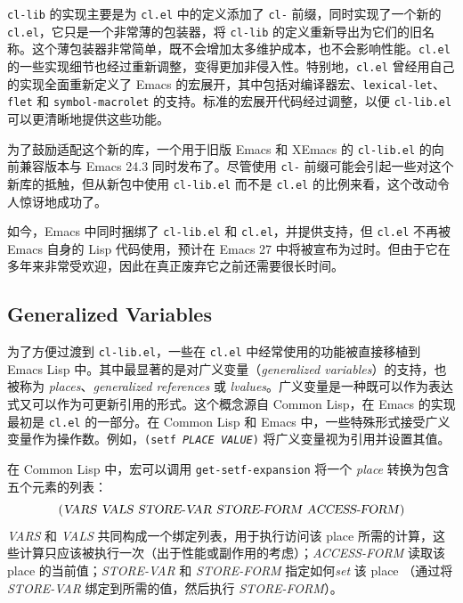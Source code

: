 \documentclass[format=acmsmall,screen]{acmart}
\newcommand \id[1] {\textrm{\textsl{#1}}}
\begin{document}
\texttt{cl-lib} 的实现主要是为 \texttt{cl.el} 中的定义添加了 \texttt{cl-} 前缀，同时实现了一个新的 \texttt{cl.el}，它只是一个非常薄的包装器，将 \texttt{cl-lib} 的定义重新导出为它们的旧名称。这个薄包装器非常简单，既不会增加太多维护成本，也不会影响性能。\texttt{cl.el} 的一些实现细节也经过重新调整，变得更加非侵入性。特别地，\texttt{cl.el} 曾经用自己的实现全面重新定义了 Emacs 的宏展开，其中包括对编译器宏、\texttt{lexical-let}、\texttt{flet} 和 \texttt{symbol-macrolet} 的支持。标准的宏展开代码经过调整，以便 \texttt{cl-lib.el} 可以更清晰地提供这些功能。

为了鼓励适配这个新的库，一个用于旧版 Emacs 和 XEmacs 的 \texttt{cl-lib.el} 的向前兼容版本与 Emacs 24.3 同时发布了。尽管使用 \texttt{cl-} 前缀可能会引起一些对这个新库的抵触，但从新包中使用 \texttt{cl-lib.el} 而不是 \texttt{cl.el} 的比例来看，这个改动令人惊讶地成功了。

如今，Emacs 中同时捆绑了 \texttt{cl-lib.el} 和 \texttt{cl.el}，并提供支持，但 \texttt{cl.el} 不再被 Emacs 自身的 Lisp 代码使用，预计在 Emacs 27 中将被宣布为过时。但由于它在多年来非常受欢迎，因此在真正废弃它之前还需要很长时间。

\subsection{Generalized Variables} %
\label{sec:generalized-variables}

为了方便过渡到 \texttt{cl-lib.el}，一些在 \texttt{cl.el} 中经常使用的功能被直接移植到 Emacs Lisp 中。其中最显著的是对广义变量（\emph{generalized variables}）的支持，也被称为 \emph{places}、\emph{generalized references} 或 \emph{lvalues}。广义变量是一种既可以作为表达式又可以作为可更新引用的形式。这个概念源自 Common Lisp，在 Emacs 的实现最初是 \texttt{cl.el} 的一部分。在 Common Lisp 和 Emacs 中，一些特殊形式接受广义变量作为操作数。例如，\texttt{(setf \id{PLACE} \id{VALUE})} 将广义变量视为引用并设置其值。

在 Common Lisp 中，宏可以调用 \texttt{get-setf-expansion} 将一个 \emph{place} 转换为包含五个元素的列表：
\begin{displaymath}
  (\id{VARS}~\id{VALS}~\id{STORE-VAR}~\id{STORE-FORM}
  ~\id{ACCESS-FORM})
\end{displaymath}
\id{VARS} 和 \id{VALS} 共同构成一个绑定列表，用于执行访问该 place 所需的计算，这些计算只应该被执行一次（出于性能或副作用的考虑）；\id{ACCESS-FORM} 读取该 place 的当前值；\id{STORE-VAR} 和 \id{STORE-FORM} 指定如何\emph{set} 该 place （通过将 \id{STORE-VAR} 绑定到所需的值，然后执行 \id{STORE-FORM}）。
\end{document}

